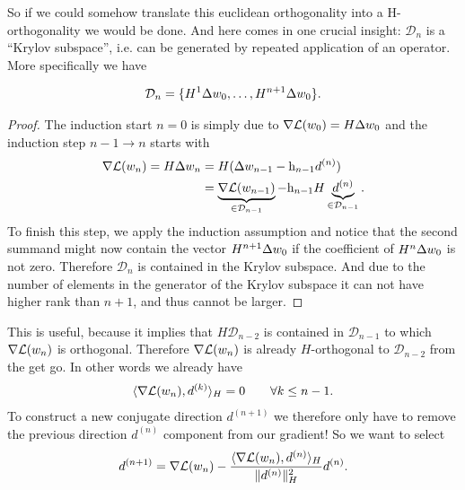 So if we could somehow translate this euclidean orthogonality into a
H-orthogonality we would be done. And here comes in one crucial insight:
\(\mathcal{D}_n\) is a ``Krylov subspace'', i.e. can be generated by repeated
application of an operator. More specifically we have
\begin{lemma}
	\begin{align*}
		\mathcal{D}_n = \{H^1 \Delta w_0, \dots, H^{n+1}\Delta w_0\}.
	\end{align*}
\end{lemma}
\begin{proof}
	The induction start \(n=0\) is simply due to \(\nabla\mathcal{L}(w_0) =
	H\Delta w_0\) and the induction step \(n-1\to n\) starts with
	\begin{align}
		\nonumber
		\nabla\mathcal{L}(w_n)= H\Delta w_n
		&= H(\Delta w_{n-1} - \text{h}_{n-1} d^{(n)})\\
		\label{eq: represent nabla Loss(weights_n) with prev gradient and d(n)}
		&= \underbrace{\nabla\mathcal{L}(w_{n-1})}_{\in \mathcal{D}_{n-1}} - \text{h}_{n-1} H
		\underbrace{d^{(n)}}_{\in \mathcal{D}_{n-1}}.
	\end{align}
	To finish this step, we apply the induction assumption and notice that the
	second summand might now contain the vector \(H^{n+1}\Delta w_0\) if the
	coefficient of \(H^{n}\Delta w_0\) is not zero. Therefore
	\(\mathcal{D}_{n}\) is contained in the Krylov subspace. And due to the
	number of elements in the generator of the Krylov subspace it can not have
	higher rank than \(n+1\), and thus cannot be larger.
\end{proof}
This is useful, because it implies that \(H\mathcal{D}_{n-2}\) is contained
in \(\mathcal{D}_{n-1}\) to which \(\nabla\mathcal{L}(w_n)\) is orthogonal.
Therefore \(\nabla\mathcal{L}(w_n)\) is already \(H\)-orthogonal to
\(\mathcal{D}_{n-2}\) from the get go. In other words we already have
\begin{align*}
	\langle \nabla\mathcal{L}(w_n), d^{(k)} \rangle_H = 0 
	\qquad \forall k\le n-1.
\end{align*}
To construct a new conjugate direction \(d^{(n+1)}\) we therefore only have to
remove the previous direction \(d^{(n)}\) component from our gradient! So we
want to select
\begin{align}\label{eq: next search direction}
	d^{(n+1)} = \nabla\mathcal{L}(w_n)
	- \frac{\langle \nabla\mathcal{L}(w_n), d^{(n)}\rangle_H}{\|d^{(n)}\|_H^2}d^{(n)}.
\end{align}


